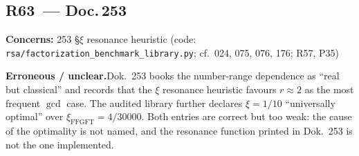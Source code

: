 \medskip


\subsection*{R63~--- Doc.\,253}

\noindent\textbf{Concerns:} 253 \S{}$\xi$ resonance heuristic (code: \texttt{rsa/\allowbreak factorization\_\allowbreak benchmark\_\allowbreak library.py}; cf.\ 024, 075, 076, 176; R57, P35)


\smallskip\noindent\textbf{Erroneous / unclear.}\quad Dok.~253 books the number-range dependence as \enquote{real but classical}
  and records that the $\xi$ resonance heuristic favours $r \approx 2$ as the
  most frequent $\gcd$ case. The audited library further declares
  $\xi = 1/10$ \enquote{universally optimal} over
  $\xi_\text{FFGFT} = 4/30000$. Both entries are correct but too weak: the
  cause of the optimality is not named, and the resonance function printed
  in Dok.~253 is not the one implemented.


